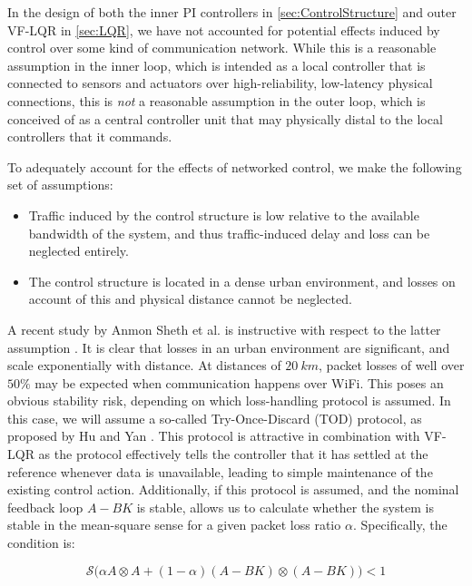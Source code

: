 In the design of both the inner PI controllers in \cref{sec:ControlStructure} and outer VF-LQR in \cref{sec:LQR}, we have not accounted for potential effects induced by control over some kind of communication network. While this is a reasonable assumption in the inner loop, which is intended as a local controller that is connected to sensors and actuators over high-reliability, low-latency physical connections, this is \textit{not} a reasonable assumption in the outer loop, which is conceived of as a central controller unit that may physically distal to the local controllers that it commands.

To adequately account for the effects of networked control, we make the following set of assumptions:

\begin{itemize}
	\item Traffic induced by the control structure is low relative to the available bandwidth of the system, and thus traffic-induced delay and loss can be neglected entirely.
	\item The control structure is located in a dense urban environment, and losses on account of this and physical distance cannot be neglected.
\end{itemize}

A recent study by Anmon Sheth et al. is instructive with respect to the latter assumption \cite{Sheth2007}. It is clear that losses in an urban environment are significant, and scale exponentially with distance. At distances of $20 \ \si{km}$, packet losses of well over $50\%$ may be expected when communication happens over WiFi. This poses an obvious stability risk, depending on which loss-handling protocol is assumed. In this case, we will assume a so-called Try-Once-Discard (TOD) protocol, as proposed by Hu and Yan \cite{Hu2007}. This protocol is attractive in combination with VF-LQR as the protocol effectively tells the controller that it has settled at the reference whenever data is unavailable, leading to simple maintenance of the existing control action. Additionally, if this protocol is assumed, and the nominal feedback loop $A-BK$ is stable, \cite{Hu2007} allows us to calculate whether the system is stable in the mean-square sense for a given packet loss ratio $\alpha$. Specifically, the condition is:

\begin{equation}\label{eq:HuStabCondition}
	\mathcal{S}\Big(\alpha A \otimes A + (1-\alpha)(A-BK) \otimes (A-BK) \Big) < 1
\end{equation}

